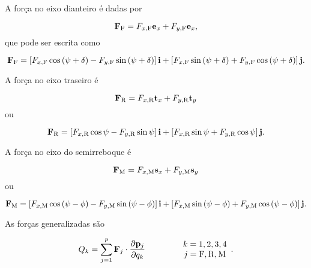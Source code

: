 \documentclass[sublist]{fei}
\begin{document}
A força no eixo dianteiro é dadas por

\begin{equation}
    {\bf F}_{\rm F} = F_{x,{\rm F}} {\bf e}_x + F_{y,{\rm F}} {\bf e}_x,
\end{equation}
que pode ser escrita como

\begin{equation} \label{ForceFront}
    {\bf F}_{\rm F} = \left[ F_{x,{\rm F}} \cos \left( \psi + \delta \right) - F_{y,{\rm F}} \sin \left( \psi + \delta \right) \right] {\bf i} + \left[ F_{x,{\rm F}} \sin \left( \psi + \delta \right) + F_{y,{\rm F}} \cos \left( \psi + \delta \right) \right] {\bf j}.
\end{equation}

A força no eixo traseiro é

\begin{equation}
    {\bf F}_{\rm R} = F_{x,{\rm R}} {\bf t}_x + F_{y,{\rm R}} {\bf t}_y
\end{equation}
ou

\begin{equation} \label{ForceRear}
    {\bf F}_{\rm R} = \left[ F_{x,{\rm R}} \cos \psi - F_{y,{\rm R}} \sin \psi \right] {\bf i} + \left[ F_{x,{\rm R}} \sin \psi + F_{y,{\rm R}} \cos \psi \right] {\bf j}.
\end{equation}

A força no eixo do semirreboque é

\begin{equation}
    {\bf F}_{\rm M} = F_{x,{\rm M}} {\bf s}_x + F_{y,{\rm M}} {\bf s}_y
\end{equation}
ou

\begin{equation} \label{ForceSemi}
    {\bf F}_{\rm M} = \left[ F_{x,{\rm M}} \cos \left( \psi - \phi \right) - F_{y,{\rm M}} \sin \left( \psi - \phi \right) \right] {\bf i} + \left[ F_{x,{\rm M}} \sin \left( \psi - \phi \right) + F_{y,{\rm M}} \cos \left( \psi - \phi \right) \right] {\bf j}.
\end{equation}

As forças generalizadas são

\begin{equation}
    Q_k = \sum_{j = 1} ^p {\bf F}_j \cdot \frac{\partial {\bf p}_j}{\partial q_k} \qquad \qquad \begin{array}{c} k = 1, 2, 3, 4 \\ j = {\rm F}, {\rm R}, {\rm M} \end{array}.
\end{equation}
\end{document}
